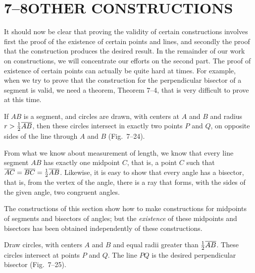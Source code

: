 \documentclass[11pt]{book}
\begin{document}
\section*{7--8\quad OTHER CONSTRUCTIONS}

It should now be clear that proving the validity of certain constructions
involves first the proof of the existence of certain points and lines, and
secondly the proof that the construction produces the desired result. In the
remainder of our work on constructions, we will concentrate our efforts on the
second part. The proof of existence of certain points can actually be quite
hard at times. For example, when we try to prove that the construction for the
perpendicular bisector of a segment is valid, we need a theorem, Theorem 7--4,
that is very difficult to prove at this time.

\begin{theorem}
If $AB$ is a segment, and circles are drawn, with centers at $A$ and $B$ and
radius $r > \frac{1}{2}\overline{AB}$, then these circles intersect in exactly two
points $P$ and $Q$, on opposite sides of the line through $A$ and $B$
(Fig.~7--24).
\end{theorem}

\begin{remark}
From what we know about measurement of length, we know that every line segment
$AB$ has exactly one midpoint $C$, that is, a point $C$ such that
$\overline{AC} = \overline{BC} = \frac{1}{2}\overline{AB}$. Likewise, it is easy to show that
every angle has a bisector, that is, from the vertex of the angle, there is a
ray that forms, with the sides of the given angle, two congruent angles.
\end{remark}

\FIGVIITWENTYFOURTWENTYFIVE

The constructions of this section show how to make \RC{} constructions for
midpoints of segments and bisectors of angles; but the \emph{existence} of
these midpoints and bisectors has been obtained independently of these
constructions.

\begin{construction}
Draw circles, with centers $A$ and $B$ and equal radii greater than
$\frac{1}{2}\overline{AB}$. These circles intersect at points $P$ and $Q$. The line
$PQ$ is the desired perpendicular bisector (Fig.~7--25).
\end{construction}
\end{document}
